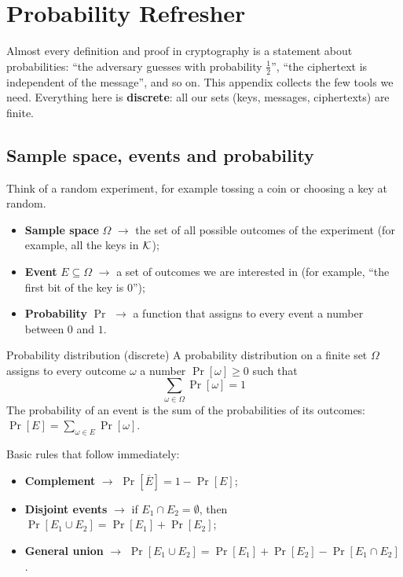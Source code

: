 \chapter{Probability Refresher}\label{ch:probability}

Almost every definition and proof in cryptography is a statement about probabilities: ``the adversary guesses with probability $\frac{1}{2}$'', ``the ciphertext is independent of the message'', and so on. This appendix collects the few tools we need. Everything here is \textbf{discrete}: all our sets (keys, messages, ciphertexts) are finite.

\section{Sample space, events and probability}

Think of a random experiment, for example tossing a coin or choosing a key at random.
\begin{itemize}
  \item \textbf{Sample space} $\Omega$ $\to$ the set of all possible outcomes of the experiment (for example, all the keys in $\mathcal{K}$);
  \item \textbf{Event} $E \subseteq \Omega$ $\to$ a set of outcomes we are interested in (for example, ``the first bit of the key is $0$'');
  \item \textbf{Probability} $\Pr$ $\to$ a function that assigns to every event a number between $0$ and $1$.
\end{itemize}

\begin{frameddefn}{Probability distribution (discrete)}
  A probability distribution on a finite set $\Omega$ assigns to every outcome $\omega$ a number $\Pr[\omega] \geq 0$ such that
  \[
    \sum_{\omega \in \Omega} \Pr[\omega] = 1
  \]
  The probability of an event is the sum of the probabilities of its outcomes: $\Pr[E] = \sum_{\omega \in E} \Pr[\omega]$.
\end{frameddefn}

Basic rules that follow immediately:
\begin{itemize}
  \item \textbf{Complement} $\to$ $\Pr[\overline{E}] = 1 - \Pr[E]$;
  \item \textbf{Disjoint events} $\to$ if $E_1 \cap E_2 = \emptyset$, then $\Pr[E_1 \cup E_2] = \Pr[E_1] + \Pr[E_2]$;
  \item \textbf{General union} $\to$ $\Pr[E_1 \cup E_2] = \Pr[E_1] + \Pr[E_2] - \Pr[E_1 \cap E_2]$.
\end{itemize}


